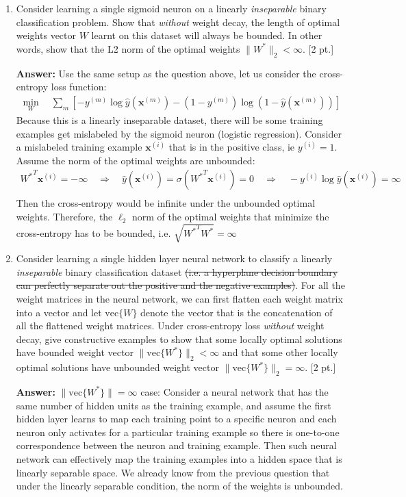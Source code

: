 \documentclass[12pt,letterpaper]{article}
\begin{document}
\begin{enumerate}
\item Consider learning a single sigmoid neuron on a linearly \textit{inseparable} binary classification problem. Show that \textit{without} weight decay, the length of optimal weights vector $W$ learnt on this dataset will always be bounded. In other words, show that the L2 norm of the optimal weights $\|W^* \|_2 < \infty$. [2 pt.]

{\color{red} 
\textbf{Answer: }
Use the same setup as the question above, let us consider the cross-entropy loss function:
\begin{align*}
  \min_W \quad \sum_m [- y^{(m)}\log\hat{y}(\mathbf{x}^{(m)}) - (1-y^{(m)}) \log(1-\hat{y}(\mathbf{x}^{(m)}))]
\end{align*}
Because this is a linearly inseparable dataset, there will be some training examples get mislabeled by the sigmoid neuron (logistic regression). Consider a mislabeled training example $\mathbf{x}^{(i)}$ that is in the positive class, ie $y^{(i)}= 1$. Assume the norm of the optimal weights are unbounded:
\begin{align*}
  {W^*}^T\mathbf{x}^{(i)} = -\infty \quad \Rightarrow \quad \hat{y}(\mathbf{x}^{(i)}) = \sigma({W^*}^T\mathbf{x}^{(i)}) = 0 \quad \Rightarrow \quad - y^{(i)}\log\hat{y}(\mathbf{x}^{(i)}) = \infty\\
\end{align*}
Then the cross-entropy would be infinite under the unbounded optimal weights. Therefore, the $\ell_2$ norm of the optimal weights that minimize the cross-entropy has to be bounded, i.e. $\sqrt{{W^*}^T{W^*}} = \infty$ 
}

\item Consider learning a single hidden layer neural network to classify a linearly \textit{inseparable} binary classification dataset \st{(i.e. a hyperplane decision boundary can perfectly separate out the positive and the negative examples)}. For all the weight matrices in the neural network, we can first flatten each weight matrix into a vector and let $\text{vec}\{W\}$ denote the vector that is the concatenation of all the flattened weight matrices. Under cross-entropy loss \textit{without} weight decay, give constructive examples to show that some locally optimal solutions have bounded weight vector $\|\text{vec}\{W^*\}\|_2<\infty$ and that some other locally optimal solutions have unbounded weight vector $\|\text{vec}\{W^*\}\|_2 = \infty$.  [2 pt.]

{\color{red} 
\textbf{Answer: }
$\|\text{vec}\{W^*\}\| = \infty$ case:
Consider a neural network that has the same number of hidden units as the training example, and assume the first hidden layer learns to map each training point to a specific neuron and each neuron only activates for a particular training example so there is one-to-one correspondence between the neuron and training example. Then such neural network can effectively map the training examples into a hidden space that is linearly separable space. We already know from the previous question that under the linearly separable condition, the norm of the weights is unbounded. 

}
\end{enumerate}
\end{document}
